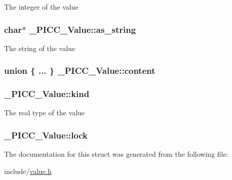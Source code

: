 The integer of the value \hypertarget{struct__PICC__Value_a32aa118c757eaf418d2dbfd2182b3242}{
\subsubsection[{as\-\_\-string}]{\setlength{\rightskip}{0pt plus 5cm}char$\ast$ \-\_\-\-P\-I\-C\-C\-\_\-\-Value\-::as\-\_\-string}}\label{struct__PICC__Value_a32aa118c757eaf418d2dbfd2182b3242}
The string of the value \hypertarget{struct__PICC__Value_ae479e83bf66b91bb89f7b7dd5b19f2b5}{
\subsubsection[{content}]{\setlength{\rightskip}{0pt plus 5cm}union \{ ... \}   \-\_\-\-P\-I\-C\-C\-\_\-\-Value\-::content}}\label{struct__PICC__Value_ae479e83bf66b91bb89f7b7dd5b19f2b5}
\hypertarget{struct__PICC__Value_a3daeb493d6690c977813226ce2f50421}{
\subsubsection[{kind}]{ \-\_\-\-P\-I\-C\-C\-\_\-\-Value\-::kind}}\label{struct__PICC__Value_a3daeb493d6690c977813226ce2f50421}
The real type of the value \hypertarget{struct__PICC__Value_aa81746d9bb365cc0a8f8229780b70e78}{
\subsubsection[{lock}]{ \-\_\-\-P\-I\-C\-C\-\_\-\-Value\-::lock}}\label{struct__PICC__Value_aa81746d9bb365cc0a8f8229780b70e78}


The documentation for this struct was generated from the following file\-:\begin{DoxyCompactItemize}
\item 
include/\hyperlink{value_8h}{value.\-h}\end{DoxyCompactItemize}
